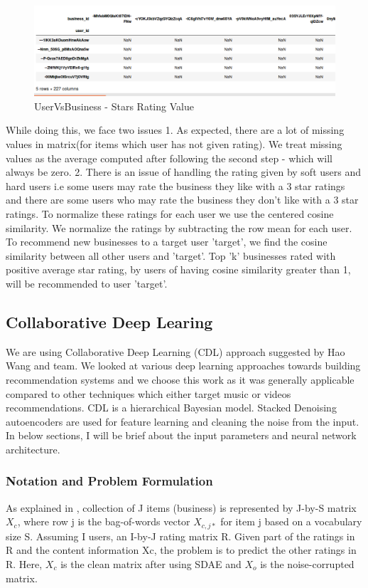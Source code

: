 \documentclass[11pt]{article}
\begin{document}
	 		\begin{figure}[h]
					\centering
					\includegraphics[scale=0.5]{uservsitem.png}
					\caption{UserVsBusiness - Stars Rating Value}
			\end{figure}
	 
		While doing this, we face two issues 
		1. As expected, there are a lot of missing values in matrix(for items which user has not given rating). We treat missing values as the average computed after following the second step - which will always be zero.
		2. There is an issue of handling the rating given by soft users and hard users i.e some users may rate the business they like with a 3 star ratings and there are some users who may rate the business they don't like with a 3 star ratings. To normalize these ratings for each user we use the centered cosine similarity. We normalize the ratings by subtracting the row mean for each user.\cite{vid1}\\
		
		To recommend new businesses to a target user 'target', we find the cosine similarity between all other users and 'target'. Top 'k' businesses rated with positive average star rating, by users of having cosine similarity greater than 1, will be recommended to user 'target'.\cite{vid2}
	
		\subsection{Collaborative Deep Learing} 
		We are using Collaborative Deep Learning \cite{cdl} (CDL) approach suggested by Hao Wang and team. We looked at various deep learning approaches towards building recommendation systems and we choose this work as it was generally applicable compared to other techniques which either target music or videos recommendations. CDL is a hierarchical Bayesian model. Stacked Denoising autoencoders \cite{sdae} are used for feature learning and cleaning the noise from the input. In below sections, I will be brief about the input parameters and neural network architecture.
		
		\subsubsection{Notation and Problem Formulation}
		As explained in \cite{cdl}, collection of J items (business) is represented by J-by-S matrix $X_c$, where row j is the bag-of-words vector $X_{c,j*}$ for item j based on a vocabulary size S. Assuming I users, an I-by-J rating matrix R. Given part of the ratings in R and the content information Xc, the problem is to predict the other ratings in R. Here, $X_c$ is the clean matrix after using SDAE and $X_o$ is the noise-corrupted matrix.
		  
\end{document}
